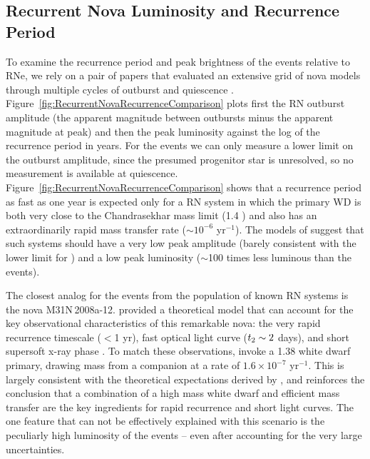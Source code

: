 \subsection{Recurrent Nova Luminosity and Recurrence Period}\label{sec:RNLuminosityRecurrence}

To examine the recurrence period and peak brightness of the \spock
events relative to RNe, we rely on a pair of papers that evaluated an
extensive grid of nova models through multiple cycles of outburst and
quiescence \citep{Prialnik:1995,Yaron:2005}.
Figure~\ref{fig:RecurrentNovaRecurrenceComparison} plots first the RN
outburst amplitude (the apparent magnitude between outbursts minus the
apparent magnitude at peak) and then the peak luminosity against the
log of the recurrence period in years.
For the \spock events we can only measure a lower limit on the
outburst amplitude, since the presumed progenitor star is unresolved,
so no measurement is available at
quiescence. Figure~\ref{fig:RecurrentNovaRecurrenceComparison} shows
that a recurrence period as fast as one year is expected only for a RN
system in which the primary WD is both very close to the Chandrasekhar
mass limit (1.4 \Msun) and also has an extraordinarily rapid mass
transfer rate ($\sim10^{-6}$ \Msun yr$^{-1}$).  The models of
\citet{Yaron:2005} suggest that such systems should have a very low
peak amplitude (barely consistent with the lower limit for \spock) and
a low peak luminosity ($\sim$100 times less luminous than the \spock
events).

The closest analog for the \spock events from the population of known
RN systems is the nova M31N\,2008a-12.  \citet{Kato:2015} provided a
theoretical model that can account for the key observational
characteristics of this remarkable nova: the very rapid recurrence
timescale ($<$1 yr), fast optical light curve ($\t2\sim2$ days), and
short supersoft x-ray phase \citep[6-18 days after optical
  outburst][]{Henze:2015a}.  To match these observations,
\citeauthor{Kato:2015} invoke a 1.38 \Msun white dwarf primary,
drawing mass from a companion at a rate of $1.6\times10^{-7}$ \Msun
yr$^{-1}$.  This is largely consistent with the theoretical
expectations derived by \citet{Yaron:2005}, and reinforces the
conclusion that a combination of a high mass white dwarf and efficient
mass transfer are the key ingredients for rapid recurrence and short
light curves. The one feature that can not be effectively explained
with this scenario is the peculiarly high luminosity of the \spock
events -- even after accounting for the very large uncertainties. 
